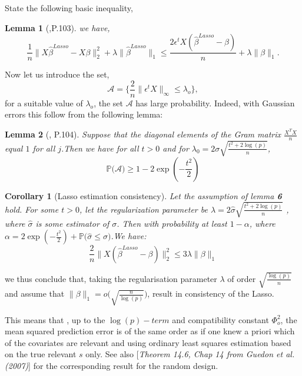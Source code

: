 \documentclass[12pt]{report}
\newtheorem {lemme}{Lemma} %
\newtheorem{corollaire}{Corollary}
\begin{document}
State the following basic inequality,
\begin{lemme}[\cite{nref14},P.103]
	we have, 
	\begin{equation}
		\frac{1}{n}\parallel X\hat{\beta}^{Lasso}-X\beta \parallel^{2}_{2} +\lambda\parallel\hat{\beta}^{Lasso} \parallel_{1} \leq \frac{2 \epsilon^{t}X(\hat{\beta}^{Lasso}-\beta)}{n}+\lambda \parallel \beta \parallel_{1}.
		\label{f29}
	\end{equation}
\end{lemme}
Now let us introduce the set, $$ \mathcal{A}=\big\{ \frac{2}{n}\parallel \epsilon^{t}X\parallel_{\infty} \leq \lambda_{o}\big\},$$
for a suitable value of $\lambda_{o}$, the set $\mathcal{A}$ has large probability. Indeed, with Gaussian errors this follow from the following lemma:
\begin{lemme}[\cite{nref14}, P.104]
	Suppose that the diagonal elements of the Gram matrix $\frac{X^{T}X}{n}$ equal $1$ for all $j$.Then we have for all $t>0$ and for $\lambda_{0}=2\sigma\sqrt{\frac{t^{2}+2\log(p)}{n}}$,
	\begin{equation}
		\mathbb{P}\big( \mathcal{A}\big)\geq 1-2\exp(-\frac{t^{2}}{2})
		\label{f31}
	\end{equation}
\end{lemme}
\begin{corollaire}[Lasso estimation consistency]
	Let the assumption of lemma \textbf{6} hold. For some $t>0$, let the regularization parameter be $\lambda=2 \hat{\sigma}\sqrt{\frac{t^{2}+2\log(p)}{n}}$ , where $\hat{\sigma}$ is some estimator of $\sigma$. Then with probability at least $1-\alpha$, where $\alpha=2\exp(-\frac{t^{2}}{2})+\mathbb{P}\big(\hat{\sigma}\leq \sigma \big)$.We have:
	\begin{equation}
		\frac{2}{n}\parallel X(\hat{\beta}^{Lasso}-\beta )\parallel^{2}_{2} \leq 3\lambda \parallel \beta \parallel_{1}
		\label{f32}
	\end{equation}
\end{corollaire}
we thus conclude that, taking the regularisation parameter $\lambda$ of order $\sqrt{\frac{\log(p)}{n}}$ and assume that $\parallel \beta \parallel_{1}=o\big(\sqrt{\frac{n}{\log(p)}}\big)$, result in consistency of the Lasso.

This means that , up to the $\log(p)-term$ and compatibility constant $\Phi_{o}^{2}$, the mean squared prediction error is of the same order as if one knew a priori which of the covariates are relevant and using ordinary least squares estimation based on the true relevant $s$ only. 
See also [\textit{Theorem 14.6, Chap 14 from Guedon et al. (2007)}] for the corresponding result for the random design.
\end{document}
